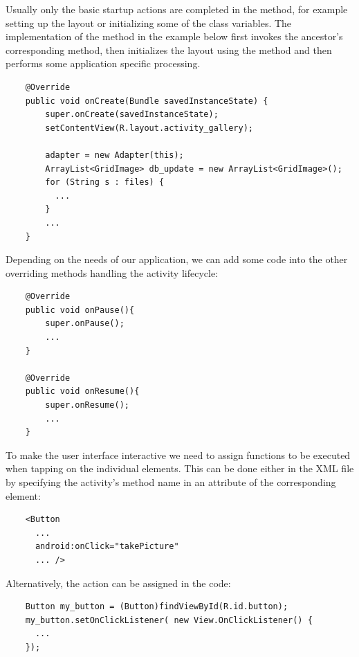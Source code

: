 Usually only the basic startup actions are completed in the  method, for example setting up the layout or initializing some of the class variables.
The implementation of the  method in the example below first invokes the ancestor's corresponding method, then initializes the layout using the  method and then performs some application specific processing. 
\begin{lstlisting}
    @Override
    public void onCreate(Bundle savedInstanceState) {
        super.onCreate(savedInstanceState);
        setContentView(R.layout.activity_gallery);
        
        adapter = new Adapter(this);
        ArrayList<GridImage> db_update = new ArrayList<GridImage>();
        for (String s : files) {
          ...
        }
        ...
    }
\end{lstlisting}
Depending on the needs of our application, we can add some code into the other overriding methods handling the activity lifecycle: 
\begin{lstlisting}
    @Override
    public void onPause(){
        super.onPause();
        ...
    }
  	
    @Override
    public void onResume(){
        super.onResume();
        ...
    }
\end{lstlisting}
To make the user interface interactive we need to assign functions to be executed when tapping on the individual elements.
This can be done either in the XML file by specifying the activity's method name in an attribute of the corresponding element: 
\begin{lstlisting}
    <Button  
      ...
      android:onClick="takePicture"
      ... />
\end{lstlisting}
Alternatively, the action can be assigned in the code:
\begin{lstlisting}
    Button my_button = (Button)findViewById(R.id.button);
    my_button.setOnClickListener( new View.OnClickListener() {
      ...    
    });
\end{lstlisting}









